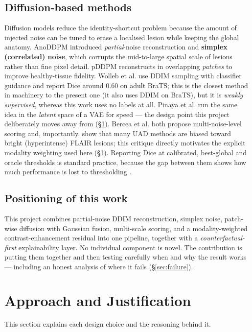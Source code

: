 \documentclass[12pt, a4paper]{article}
\theoremstyle{definition}\newtheorem{definition}{Definition}
\begin{document}
\subsection{Diffusion-based methods}
Diffusion models reduce the identity-shortcut problem because the amount of injected
noise can be tuned to erase a localised lesion while keeping the global anatomy.
AnoDDPM \cite{wyatt2022} introduced \emph{partial}-noise reconstruction and
\textbf{simplex (correlated) noise}, which corrupts the mid-to-large spatial scale of
lesions rather than fine pixel detail. pDDPM \cite{behrendt2023} reconstructs in
overlapping \emph{patches} to improve healthy-tissue fidelity. Wolleb et al.
\cite{wolleb2022} use DDIM sampling with classifier guidance and report Dice around
$0.60$ on adult BraTS; this is the closest method in machinery to the present one (it
also uses DDIM on BraTS), but it is \emph{weakly supervised}, whereas this work uses no
labels at
all. Pinaya et al. \cite{pinaya2022} run the same idea in the \emph{latent} space of a
VAE for speed --- the design point this project deliberately moves away from
(\S\ref{sec:approach}). Bercea et al. \cite{bercea2023} both propose multi-noise-level
scoring and, importantly, show that many UAD methods are biased toward bright
(hyperintense) FLAIR lesions; this critique directly motivates the explicit modality
weighting used here (\S\ref{sec:approach}).
Reporting Dice at calibrated, best-global and oracle thresholds is standard practice,
because the gap between them shows how much performance is lost to thresholding
\cite{zimmerer2022,baur2021}.

\subsection{Positioning of this work}
This project combines partial-noise DDIM reconstruction, simplex noise, patch-wise
diffusion with Gaussian fusion, multi-scale scoring, and a modality-weighted
contrast-enhancement residual into one pipeline, together with a
\emph{counterfactual-first} explainability layer. No individual component is novel. The
contribution is putting them together and then testing carefully when and why the result
works --- including an honest analysis of where it fails (\S\ref{sec:failure}).

\section{Approach and Justification}
\label{sec:approach}
This section explains each design choice and the reasoning behind it.
\end{document}
